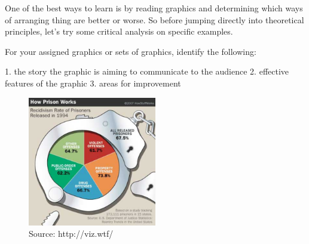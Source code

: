 \documentclass[
  letterpaper,
  DIV=11,
  numbers=noendperiod]{scrreprt}
\newenvironment{Shaded}{\begin{snugshade}}{\end{snugshade}}
\newcommand{\NormalTok}[1]{\textcolor[rgb]{0.00,0.23,0.31}{#1}}
\begin{document}
One of the best ways to learn is by reading graphics and determining
which ways of arranging thing are better or worse. So before jumping
directly into theoretical principles, let's try some critical analysis
on specific examples.

\begin{Shaded}
\begin{Highlighting}[]
\NormalTok{For your assigned graphics or sets of graphics, identify the following:}

\NormalTok{1. the story the graphic is aiming to communicate to the audience}
\NormalTok{2. effective features of the graphic}
\NormalTok{3. areas for improvement}
\end{Highlighting}
\end{Shaded}

\begin{figure}[H]

{\centering \includegraphics[width=0.5\textwidth,height=\textheight]{src/../images/badviz3.png}

}

\caption{Source: http://viz.wtf/}

\end{figure}%

\hfill\break
\hfill\break
\hfill\break
\end{document}
